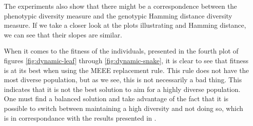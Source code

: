 
The experiments also show that there might be a correspondence between the phenotypic \dia{} diversity measure and the genotypic Hamming distance diversity measure. If we take a closer look at the plots illustrating \dia{} and Hamming distance, we can see that their slopes are similar. %

When it comes to the fitness of the individuals, presented in the fourth plot of figures \ref{fig:dynamic-leaf} through \ref{fig:dynamic-snake}, it is clear to see that fitness is at its best when using the MEEE replacement rule. This rule does not have the most diverse population, but as we see, this is not necessarily a bad thing. This indicates that it is not the best solution to aim for a highly diverse population. One must find a balanced solution and take advantage of the fact that it is possible to switch between maintaining a high diversity and not doing so, which is in correspondance with the results presented in \cite{Darwen00doesextra}.
